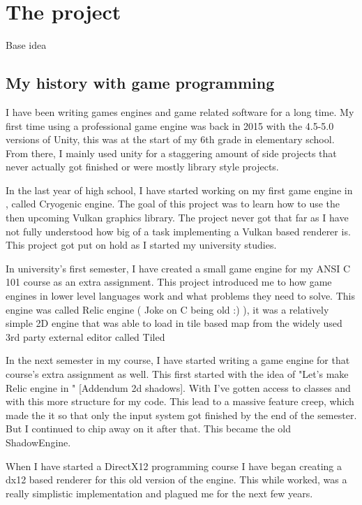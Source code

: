 \section{The project}

Base idea

\subsection{My history with game programming}
I have been writing games engines and game related software for a long time.
My first time using a professional game engine was back in 2015 with the 4.5-5.0 versions of Unity, this was at the start of my 6th grade in elementary school. From there, I mainly used unity for a staggering amount of side projects that never actually got finished or were mostly library style projects. 

In the last year of high school, I have started working on my first game engine in \Csh, called Cryogenic engine.
The goal of this project was to learn how to use the then upcoming Vulkan graphics library.
The project never got that far as I have not fully understood how big of a task implementing a Vulkan based renderer is.
This project got put on hold as I started my university studies.

In university's first semester, I have created a small game engine for my ANSI C 101 course as an extra assignment.
This project introduced me to how game engines in lower level languages work and what problems they need to solve.
This engine was called Relic engine ( Joke on C being old :) ),
it was a relatively simple 2D engine that was able to load in tile based map from the widely used 3rd party external editor called Tiled \cite{tiled}

In the next semester in my  course, I have started writing a game engine for that course's extra assignment as well. This first started with the idea of "Let's make Relic engine in \Cpp" [Addendum 2d shadows].
With \Cpp I've gotten access to classes and with this more structure for my code.
This lead to a massive feature creep, which made the it so that only the input system got finished by the end of the semester. But I continued to chip away on it after that. This became the old ShadowEngine.

When I have started a DirectX12 programming course I have began creating a dx12 based renderer for this old version of the engine. This while worked, was a really simplistic implementation and plagued me for the next few years.


